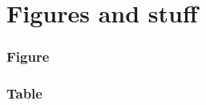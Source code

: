 \documentclass[
	11pt, %
	aspectratio=169, %
]{beamer}
\begin{document}
\section{Figures and stuff}

\begin{frame}
  \frametitle{Figure}

  

\end{frame}

\begin{frame}
  \frametitle{Table}

  

\end{frame}
\end{document}
